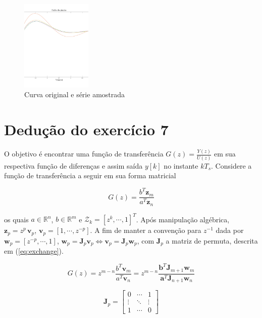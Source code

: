 \documentclass[twoside, fleqn]{article}
\begin{document}
    \begin{figure}[H]
	\center
	\includegraphics[trim=200 200 200 200, width=0.3\textwidth]{./images/errozoh.pdf}
	\caption{Curva original e série amostrada}
	\label{fig:ex1}
    \end{figure}
    

\section*{Dedução do exercício 7}
\label{sec:deducao7}

    O objetivo é encontrar uma função de transferência $G(z) = \frac{Y(z)}{U(z)}$ em sua respectiva função de diferenças e assim saída $y[k]$ no instante $k T_s$. Considere a função de transferência a seguir em sua forma matricial
    
        \begin{equation}
            G(z) = \frac{b^T \textbf{z}_m}{a^T \textbf{z}_n}    
            \label{eq:Gz}
        \end{equation}
    
    os quais $a \in \mathbb{R}^n$, $b \in \mathbb{R}^m$ e $\mathcal{Z}_k = \left[z^k, \cdots, 1\right]^T$. Após manipulação algébrica, $\textbf{z}_p = z^p \, \textbf{v}_p$, $\textbf{v}_p = [1, \cdots, z^{-p}]$. A fim de manter a convenção para $z^{-1}$ dada por $\textbf{w}_p =  [z^{-p}, \cdots, 1]$, $\textbf{w}_p = \textbf{J}_p \textbf{v}_p \Leftrightarrow{\textbf{v}_p = \textbf{J}_p \textbf{w}_p}$, com $\textbf{J}_p$ a matriz de permuta, descrita em (\ref{eq:exchange}).
    
        \begin{equation}
            G(z) = z^{m-n}\frac{b^T \textbf{v}_m}{a^T \textbf{v}_n} = z^{m-n} \frac{\textbf{b}^T \textbf{J}_{m+1} \textbf{w}_m}{\textbf{a}^T \textbf{J}_{n+1} \textbf{w}_n}
        \label{eq:Gv}
        \end{equation}
    
        \begin{equation}
            \textbf{J}_p = 
            \begin{bmatrix}
                0&\cdots&1\\
                \vdots & \ddots & \vdots\\
                1&\cdots&0
            \end{bmatrix}
            \label{eq:exchange}
        \end{equation}
    
\end{document}
